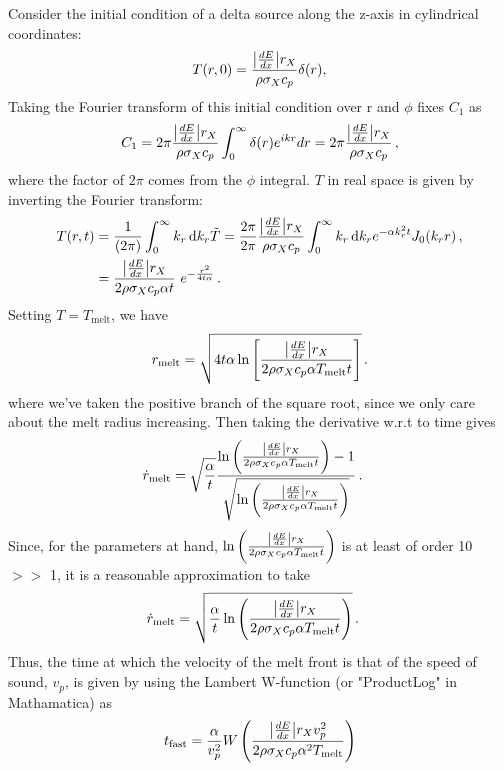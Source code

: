 \documentclass{article}
\newcommand*\diff{\mathop{}\!\mathrm{d}}
\newcommand*\te[1]{\text{#1}}
\newcommand*\p[1]{\left(#1\right)}
\newcommand*\ps[1]{\left[#1\right]}
\newcommand*\f[2]{\frac{#1}{#2}}
\begin{document}
Consider the initial condition of a delta source along the z-axis in cylindrical coordinates:
\begin{align}
T(r,0) = \f{\abs{\frac{dE}{dx}}r_X}{\rho \sigma_X c_p}\delta(r),
\end{align}
Taking the Fourier transform of this initial condition over r and $\phi$ fixes $C_1$ as 
\begin{align}
C_1 =  2\pi \f{\abs{\frac{dE}{dx}}r_X}{\rho \sigma_X c_p}\int_{0}^{\infty}\delta(r)e^{i k r} dr = 2\pi\f{\abs{\frac{dE}{dx}}r_X}{\rho \sigma_X c_p}\,,
\end{align}
where the factor of $2 \pi$ comes from the $\phi$ integral.
$T$ in real space is given by inverting the Fourier transform:
\begin{align}
T(r,t) &=\frac{1}{\p{2\pi}} \int_0^\infty k_r \diff{k_r}\tilde{T} = \frac{2\pi}{2\pi}\f{\abs{\frac{dE}{dx}}r_X}{\rho \sigma_X c_p}\int_0^\infty k_r\diff k_r e^{-\alpha k_r^2 t}J_0(k_r r)\,,\\
&=\f{\abs{\frac{dE}{dx}}r_X}{2 \rho \sigma_X c_p \alpha t}\ e^{-\f{r^2}{4t\alpha}}\,.
\end{align}
Setting $T = T_\te{melt}$, we have
\begin{align}
r_\te{melt} = \sqrt{4t\alpha\ln\ps{\f{\abs{\frac{dE}{dx}}r_X}{2 \rho \sigma_X c_p \alpha T_\te{melt} t}}}\,.
\end{align}
where we've taken the positive branch of the square root, since we only care about the melt radius increasing. Then taking the derivative w.r.t to time gives
\begin{align}
\dot r_\te{melt} &=\sqrt{\f{\alpha}{t}}\f{\ln\p{\f{\abs{\frac{dE}{dx}}r_X}{2 \rho \sigma_X c_p \alpha T_\te{melt} t}} - 1}{\sqrt{\ln\p{\f{\abs{\frac{dE}{dx}} r_X}{2 \rho \sigma_X c_p \alpha T_\te{melt} t}}}}\,.
\end{align}
Since, for the parameters at hand, $\ln\p{\f{\abs{\frac{dE}{dx}}r_X}{2 \rho \sigma_X c_p \alpha T_\te{melt} t}}$ is at least of order 10 $>>$ 1, it is a reasonable approximation to take
\begin{align}
\dot r_\te{melt} &=\sqrt{\f{\alpha}{t}\ln\p{\frac{\abs{\frac{dE}{dx}}r_X}{2 \rho \sigma_X c_p \alpha T_\te{melt} t}}}\,.
\end{align}
Thus, the time at which the velocity of the melt front is that of the speed of sound, $v_p$, is given by using the Lambert W-function (or "ProductLog" in Mathamatica) as
\begin{align}
t_{\te{fast}} = \f{\alpha}{v_p^2}W\p{{\f{\abs{\frac{dE}{dx}}r_Xv_p^2}{2 \rho \sigma_X c_p \alpha^2 T_\te{melt}}}}
\end{align}
\end{document}
